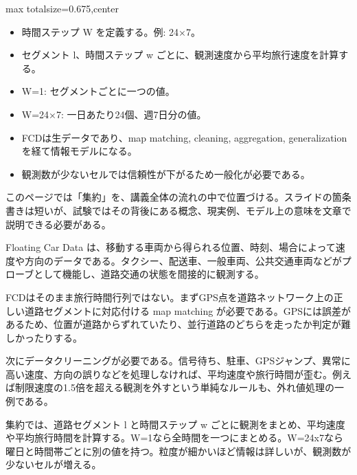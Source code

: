\clearpage
{}
\begin{adjustbox}{max totalsize={\textwidth}{0.675\textheight},center}
\begin{minipage}{\textwidth}\scriptsize
\begin{minipage}[t]{0.485\textwidth}
\begin{itemize}
\item 時間ステップ W を定義する。例: 24×7。
\item セグメント l、時間ステップ w ごとに、観測速度から平均旅行速度を計算する。
\item W=1: セグメントごとに一つの値。
\item W=24×7: 一日あたり24個、週7日分の値。
\end{itemize}
\begin{itemize}
\item FCDは生データであり、map matching, cleaning, aggregation, generalization を経て情報モデルになる。
\item 観測数が少ないセルでは信頼性が下がるため一般化が必要である。
\end{itemize}
\end{minipage}\hfill
\begin{minipage}[t]{0.485\textwidth}
このページでは「集約」を、講義全体の流れの中で位置づける。スライドの箇条書きは短いが、試験ではその背後にある概念、現実例、モデル上の意味を文章で説明できる必要がある。\par
Floating Car Data は、移動する車両から得られる位置、時刻、場合によって速度や方向のデータである。タクシー、配送車、一般車両、公共交通車両などがプローブとして機能し、道路交通の状態を間接的に観測する。\par
FCDはそのまま旅行時間行列ではない。まずGPS点を道路ネットワーク上の正しい道路セグメントに対応付ける map matching が必要である。GPSには誤差があるため、位置が道路からずれていたり、並行道路のどちらを走ったか判定が難しかったりする。\par
次にデータクリーニングが必要である。信号待ち、駐車、GPSジャンプ、異常に高い速度、方向の誤りなどを処理しなければ、平均速度や旅行時間が歪む。例えば制限速度の1.5倍を超える観測を外すという単純なルールも、外れ値処理の一例である。\par
集約では、道路セグメント l と時間ステップ w ごとに観測をまとめ、平均速度や平均旅行時間を計算する。W=1なら全時間を一つにまとめる。W=24x7なら曜日と時間帯ごとに別の値を持つ。粒度が細かいほど情報は詳しいが、観測数が少ないセルが増える。\par

\end{minipage}
\end{minipage}
\end{adjustbox}
